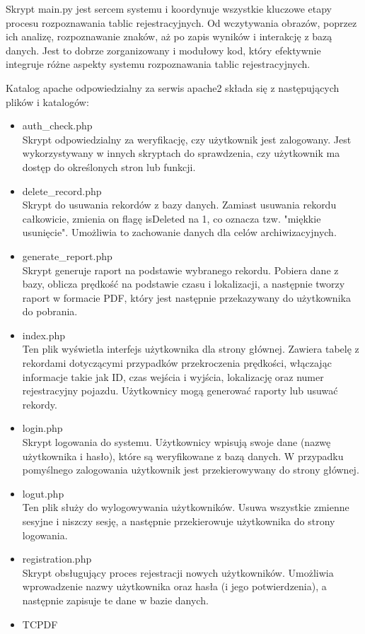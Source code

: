 \documentclass[12pt,a4paper,oneside]{article}
\theoremstyle{definition}
\numberwithin{equation}{section}
\begin{document}
Skrypt main.py jest sercem systemu i koordynuje wszystkie kluczowe etapy procesu rozpoznawania tablic rejestracyjnych. Od wczytywania obrazów, poprzez ich analizę, rozpoznawanie znaków, aż po zapis wyników i interakcję z bazą danych. Jest to dobrze zorganizowany i modułowy kod, który efektywnie integruje różne aspekty systemu rozpoznawania tablic rejestracyjnych.



Katalog apache odpowiedzialny za serwis apache2 składa się z następujących plików i katalogów:

\begin{itemize}
  \item auth{\_}check.php \\
Skrypt odpowiedzialny za weryfikację, czy użytkownik jest zalogowany. Jest wykorzystywany w innych skryptach do sprawdzenia, czy użytkownik ma dostęp do określonych stron lub funkcji.  
  \item delete{\_}record.php \\
Skrypt do usuwania rekordów z bazy danych. Zamiast usuwania rekordu całkowicie, zmienia on flagę isDeleted na 1, co oznacza tzw. "miękkie usunięcie". Umożliwia to zachowanie danych dla celów archiwizacyjnych.  
  \item generate{\_}report.php \\
Skrypt generuje raport na podstawie wybranego rekordu. Pobiera dane z bazy, oblicza prędkość na podstawie czasu i lokalizacji, a następnie tworzy raport w formacie PDF, który jest następnie przekazywany do użytkownika do pobrania.  
  \item index.php \\
Ten plik wyświetla interfejs użytkownika dla strony głównej. Zawiera tabelę z rekordami dotyczącymi przypadków przekroczenia prędkości, włączając informacje takie jak ID, czas wejścia i wyjścia, lokalizację oraz numer rejestracyjny pojazdu. Użytkownicy mogą generować raporty lub usuwać rekordy.
  \item login.php \\
Skrypt logowania do systemu. Użytkownicy wpisują swoje dane (nazwę użytkownika i hasło), które są weryfikowane z bazą danych. W przypadku pomyślnego zalogowania użytkownik jest przekierowywany do strony głównej.
  \item logut.php \\
Ten plik służy do wylogowywania użytkowników. Usuwa wszystkie zmienne sesyjne i niszczy sesję, a następnie przekierowuje użytkownika do strony logowania.  
  
  \item registration.php \\
Skrypt obsługujący proces rejestracji nowych użytkowników. Umożliwia wprowadzenie nazwy użytkownika oraz hasła (i jego potwierdzenia), a następnie zapisuje te dane w bazie danych.  
  \item TCPDF
\end{itemize}
\end{document}
